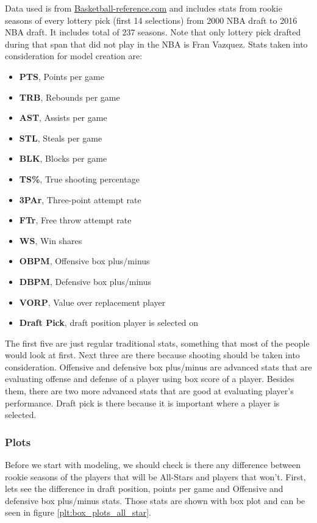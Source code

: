 \documentclass[a4paper]{article}
\begin{document}
Data used is from \href{https://www.basketball-reference.com/}{Basketball-reference.com} and includes stats from rookie seasons of every lottery pick (first 14 selections) from 2000 NBA draft to 2016 NBA draft. It includes total of 237 seasons. Note that only lottery pick drafted during that span that did not play in the NBA is Fran Vazquez. Stats taken into consideration for model creation are:

\begin{itemize}
	\item \textbf{PTS}, Points per game
	\item \textbf{TRB}, Rebounds per game
	\item \textbf{AST}, Assists per game
	\item \textbf{STL}, Steals per game
	\item \textbf{BLK}, Blocks per game
	\item \textbf{TS\%}, True shooting percentage
	\item \textbf{3PAr}, Three-point attempt rate
	\item \textbf{FTr}, Free throw attempt rate
	\item \textbf{WS}, Win shares
	\item \textbf{OBPM}, Offensive box plus/minus
	\item \textbf{DBPM}, Defensive box plus/minus
	\item \textbf{VORP}, Value over replacement player
	\item \textbf{Draft Pick}, draft position player is selected on
\end{itemize}

The first five are just regular traditional stats, something that most of the people would look at first. Next three are there because shooting should be taken into consideration. Offensive and defensive box plus/minus are advanced stats that are evaluating offense and defense of a player using box score of a player. Besides them, there are two more advanced stats that are good at evaluating player's performance. Draft pick is there because it is important where a player is selected.

\subsubsection{Plots}
\label{subsubsec:plots_all_stars}

Before we start with modeling, we should check is there any difference between rookie seasons of the players that will be All-Stars and players that won't. First, lets see the difference in draft position, points per game and Offensive and defensive box plus/minus stats. Those stats are shown with box plot \cite{boxplots} and can be seen in figure \ref{plt:box_plots_all_star}.
\end{document}
